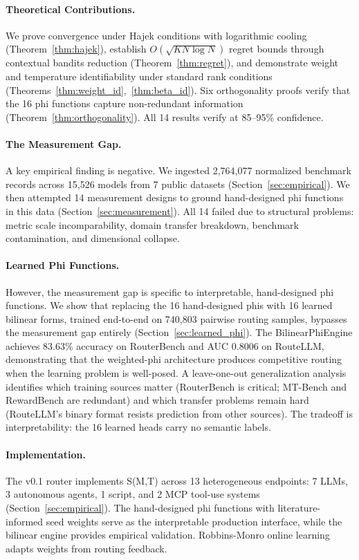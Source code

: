 \paragraph{Theoretical Contributions.}
We prove convergence under Hajek conditions with logarithmic cooling (Theorem~\ref{thm:hajek}), establish $O(\sqrt{KN\log N})$ regret bounds through contextual bandits reduction (Theorem~\ref{thm:regret}), and demonstrate weight and temperature identifiability under standard rank conditions (Theorems~\ref{thm:weight_id},~\ref{thm:beta_id}). Six orthogonality proofs verify that the 16 phi functions capture non-redundant information (Theorem~\ref{thm:orthogonality}). All 14 results verify at 85--95\% confidence.

\paragraph{The Measurement Gap.}
A key empirical finding is negative. We ingested 2,764,077 normalized benchmark records across 15,526 models from 7 public datasets (Section~\ref{sec:empirical}). We then attempted 14 measurement designs to ground hand-designed phi functions in this data (Section~\ref{sec:measurement}). All 14 failed due to structural problems: metric scale incomparability, domain transfer breakdown, benchmark contamination, and dimensional collapse.

\paragraph{Learned Phi Functions.}
However, the measurement gap is specific to interpretable, hand-designed phi functions. We show that replacing the 16 hand-designed phis with 16 learned bilinear forms, trained end-to-end on 740,803 pairwise routing samples, bypasses the measurement gap entirely (Section~\ref{sec:learned_phi}). The BilinearPhiEngine achieves 83.63\% accuracy on RouterBench and AUC 0.8006 on RouteLLM, demonstrating that the weighted-phi architecture produces competitive routing when the learning problem is well-posed. A leave-one-out generalization analysis identifies which training sources matter (RouterBench is critical; MT-Bench and RewardBench are redundant) and which transfer problems remain hard (RouteLLM's binary format resists prediction from other sources). The tradeoff is interpretability: the 16 learned heads carry no semantic labels.

\paragraph{Implementation.}
The v0.1 router implements S(M,T) across 13 heterogeneous endpoints: 7 LLMs, 3 autonomous agents, 1 script, and 2 MCP tool-use systems (Section~\ref{sec:empirical}). The hand-designed phi functions with literature-informed seed weights serve as the interpretable production interface, while the bilinear engine provides empirical validation. Robbins-Monro online learning adapts weights from routing feedback.

